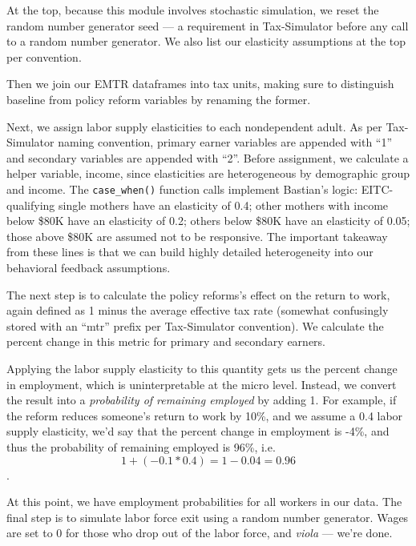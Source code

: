 \documentclass[
]{article}
\begin{document}
At the top, because this module involves stochastic simulation, we reset
the random number generator seed --- a requirement in Tax-Simulator
before any call to a random number generator. We also list our
elasticity assumptions at the top per convention.

Then we join our EMTR dataframes into tax units, making sure to
distinguish baseline from policy reform variables by renaming the
former.

Next, we assign labor supply elasticities to each nondependent adult. As
per Tax-Simulator naming convention, primary earner variables are
appended with ``1'' and secondary variables are appended with ``2''.
Before assignment, we calculate a helper variable, income, since
elasticities are heterogeneous by demographic group and income. The
\texttt{case\_when()} function calls implement Bastian's logic:
EITC-qualifying single mothers have an elasticity of 0.4; other mothers
with income below \$80K have an elasticity of 0.2; others below \$80K
have an elasticity of 0.05; those above \$80K are assumed not to be
responsive. The important takeaway from these lines is that we can build
highly detailed heterogeneity into our behavioral feedback assumptions.

The next step is to calculate the policy reforms's effect on the return
to work, again defined as 1 minus the average effective tax rate
(somewhat confusingly stored with an ``mtr'' prefix per Tax-Simulator
convention). We calculate the percent change in this metric for primary
and secondary earners.

Applying the labor supply elasticity to this quantity gets us the
percent change in employment, which is uninterpretable at the micro
level. Instead, we convert the result into a \emph{probability of
remaining employed} by adding 1. For example, if the reform reduces
someone's return to work by 10\%, and we assume a 0.4 labor supply
elasticity, we'd say that the percent change in employment is -4\%, and
thus the probability of remaining employed is 96\%,
i.e.~\[1 + (-0.1 * 0.4) = 1 - 0.04 = 0.96\].

At this point, we have employment probabilities for all workers in our
data. The final step is to simulate labor force exit using a random
number generator. Wages are set to 0 for those who drop out of the labor
force, and \emph{viola} --- we're done.
\end{document}
